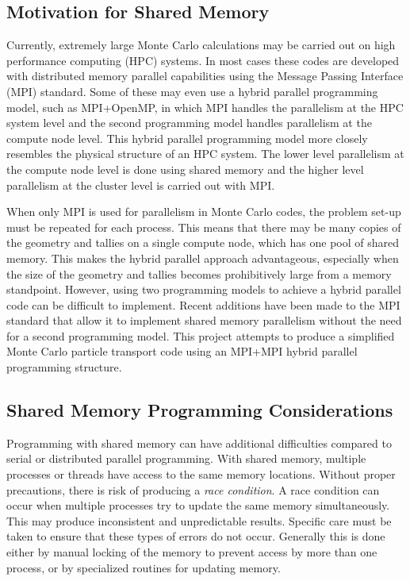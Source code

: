 \documentclass{mc2015}
\begin{document}
\subsection{Motivation for Shared Memory}

Currently, extremely large Monte Carlo calculations may be carried out on
high performance computing (HPC) systems.
In most cases these codes are developed with distributed memory parallel capabilities
using the Message Passing Interface (MPI) standard.
Some of these may even use a hybrid parallel programming model,
such as MPI+OpenMP, in which MPI handles the parallelism at the HPC system level
and the second programming model handles parallelism at the compute node level.
This hybrid parallel programming model more closely resembles
the physical structure of an HPC system.
The lower level parallelism at the compute node level is done using shared memory
and the higher level parallelism at the cluster level is carried out with MPI.

When only MPI is used for parallelism in Monte Carlo codes,
the problem set-up must be repeated for each process.
This means that there may be many copies of the geometry and tallies
on a single compute node, which has one pool of shared memory.
This makes the hybrid parallel approach advantageous,
especially when the size of the geometry and tallies becomes prohibitively large
from a memory standpoint.
However, using two programming models to achieve a hybrid parallel code
can be difficult to implement.
Recent additions have been made to the MPI standard that allow it to implement
shared memory parallelism without the need for a second programming model.
This project attempts to produce a simplified Monte Carlo particle transport code
using an MPI+MPI hybrid parallel programming structure.

\subsection{Shared Memory Programming Considerations}

Programming with shared memory can have additional difficulties
compared to serial or distributed parallel programming.
With shared memory,
multiple processes or threads have access to the same memory locations.
Without proper precautions, there is risk of producing a \emph{race condition}.
A race condition can occur when multiple processes try to
update the same memory simultaneously.
This may produce inconsistent and unpredictable results.
Specific care must be taken to ensure that these types of errors do not occur.
Generally this is done either by manual locking of the memory to prevent access
by more than one process, or by specialized routines for updating memory.
\end{document}
